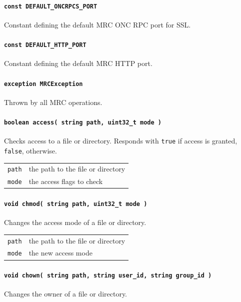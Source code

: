 \paragraph{\texttt{const DEFAULT\_ONCRPCS\_PORT}}
Constant defining the default MRC ONC RPC port for SSL.

\paragraph{\texttt{const DEFAULT\_HTTP\_PORT}}
Constant defining the default MRC HTTP port.

\paragraph{\texttt{exception MRCException}}
Thrown by all MRC operations.

\paragraph{\texttt{boolean access( string path, uint32\_t mode )}}
Checks access to a file or directory. Responds with \texttt{true} if access is granted, \texttt{false}, otherwise.

\begin{tabularx}{\textwidth}{lX}
 \texttt{path} & the path to the file or directory\\
 \texttt{mode} & the access flags to check\\
\end{tabularx}

\paragraph{\texttt{void chmod( string path, uint32\_t mode )}}
Changes the access mode of a file or directory.

\begin{tabularx}{\textwidth}{lX}
 \texttt{path} & the path to the file or directory\\
 \texttt{mode} & the new access mode\\
\end{tabularx}

\paragraph{\texttt{void chown( string path, string user\_id, string group\_id )}}
Changes the owner of a file or directory.

